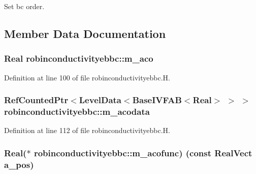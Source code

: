 Set bc order. 



\subsection{Member Data Documentation}
\subsubsection[{\texorpdfstring{m\+\_\+aco}{m_aco}}]{\setlength{\rightskip}{0pt plus 5cm}Real robinconductivityebbc\+::m\+\_\+aco\hspace{0.3cm}{\ttfamily [protected]}}\hypertarget{classrobinconductivityebbc_a463f9277e8eae417183e890852a11008}{}\label{classrobinconductivityebbc_a463f9277e8eae417183e890852a11008}


Definition at line 100 of file robinconductivityebbc.\+H.

\subsubsection[{\texorpdfstring{m\+\_\+acodata}{m_acodata}}]{\setlength{\rightskip}{0pt plus 5cm}Ref\+Counted\+Ptr$<$Level\+Data$<$Base\+I\+V\+F\+AB$<$Real$>$ $>$ $>$ robinconductivityebbc\+::m\+\_\+acodata\hspace{0.3cm}{\ttfamily [protected]}}\hypertarget{classrobinconductivityebbc_a6490a5545dfe2cf3c0c03f858d8ad7f5}{}\label{classrobinconductivityebbc_a6490a5545dfe2cf3c0c03f858d8ad7f5}


Definition at line 112 of file robinconductivityebbc.\+H.

\subsubsection[{\texorpdfstring{m\+\_\+acofunc}{m_acofunc}}]{\setlength{\rightskip}{0pt plus 5cm}Real($\ast$ robinconductivityebbc\+::m\+\_\+acofunc) (const Real\+Vect a\+\_\+pos)\hspace{0.3cm}{\ttfamily [protected]}}\hypertarget{classrobinconductivityebbc_ad7a0ac42c881a9306275a74e0fc60c60}{}\label{classrobinconductivityebbc_ad7a0ac42c881a9306275a74e0fc60c60}


